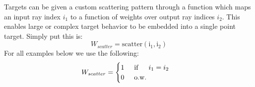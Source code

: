 \documentclass[lettersize,journal]{IEEEtran}
\begin{document}
Targets can be given a custom scattering pattern through a function which maps an input ray index $i_1$ to a function of weights over output ray indices $i_2$. This enables large or complex target behavior to be embedded into a single point target. Simply put this is:
\begin{equation}
    W_{scatter}=\operatorname{scatter(i_1, i_2)}
\end{equation}
For all examples below we use the following:
\begin{equation}
    W_{scatter}=
    \begin{cases}
        1 \hspace{0.5cm} \mathrm{if} \hspace{0.5cm} i_1=i_2\\
        0\hspace{0.5cm} \mathrm{o.w.}
    \end{cases}
\end{equation}
\end{document}
